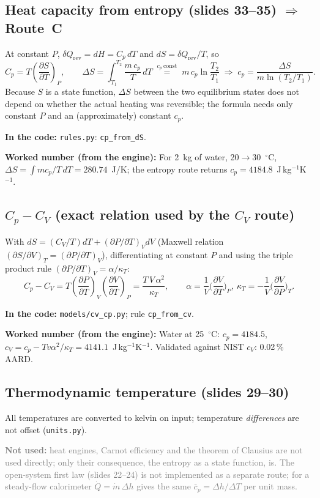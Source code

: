 \documentclass[11pt,a4paper]{article}
\newcommand{\code}[1]{\texttt{\small #1}}
\newcommand{\where}[1]{\par\noindent\textbf{In the code:} #1\par}
\newcommand{\num}[1]{\par\noindent\textbf{Worked number (from the engine):} #1\par}
\newcommand{\notused}[1]{\par\noindent\textcolor{gray}{\textbf{Not used:} #1}\par}
\begin{document}
\subsection{Heat capacity from entropy (slides 33--35) $\Rightarrow$ Route~C}
At constant $P$, $\delta Q_\mathrm{rev}=dH=C_p\,dT$ and $dS=\delta Q_\mathrm{rev}/T$, so
\[
C_p=T\left(\frac{\partial S}{\partial T}\right)_P ,\qquad
\Delta S=\int_{T_1}^{T_2}\frac{m\,c_p}{T}\,dT \;\overset{c_p\ \text{const}}{=}\; m\,c_p\ln\frac{T_2}{T_1}
\;\Rightarrow\; c_p=\frac{\Delta S}{m\ln(T_2/T_1)} .
\]
Because $S$ is a state function, $\Delta S$ between the two equilibrium states does not depend on whether
the actual heating was reversible; the formula needs only constant $P$ and an (approximately) constant
$c_p$.
\where{\code{rules.py}: \code{cp\_from\_dS}.}
\num{For 2~kg of water, 20$\to$30~$^\circ$C, $\Delta S=\int m c_p/T\,dT=280.74$~J/K; the entropy route
returns $c_p=4184.8$~J\,kg$^{-1}$K$^{-1}$.}

\subsection{$C_p-C_V$ (exact relation used by the $C_V$ route)}
With $dS=(C_V/T)dT+(\partial P/\partial T)_V dV$ (Maxwell relation $(\partial S/\partial V)_T=(\partial
P/\partial T)_V$), differentiating at constant $P$ and using the triple product rule
$(\partial P/\partial T)_V=\alpha/\kappa_T$:
\[
C_p-C_V=T\left(\frac{\partial P}{\partial T}\right)_V\left(\frac{\partial V}{\partial T}\right)_P
=\frac{T\,V\,\alpha^2}{\kappa_T},\qquad
\alpha=\frac1V\Big(\frac{\partial V}{\partial T}\Big)_P,\ \kappa_T=-\frac1V\Big(\frac{\partial V}{\partial P}\Big)_T .
\]
\where{\code{models/cv\_cp.py}; rule \code{cp\_from\_cv}.}
\num{Water at 25~$^\circ$C: $c_p=4184.5$, $c_V=c_p-Tv\alpha^2/\kappa_T=4141.1$~J\,kg$^{-1}$K$^{-1}$.
Validated against NIST $c_V$: 0.02\,\% AARD.}

\subsection{Thermodynamic temperature (slides 29--30)}
All temperatures are converted to kelvin on input; temperature \emph{differences} are not offset
(\code{units.py}).
\notused{heat engines, Carnot efficiency and the theorem of Clausius are not used directly; only their
consequence, the entropy as a state function, is. The open-system first law (slides 22--24) is not
implemented as a separate route; for a steady-flow calorimeter $\dot Q=\dot m\,\Delta h$ gives the same
$\bar c_p=\Delta h/\Delta T$ per unit mass.}
\end{document}
